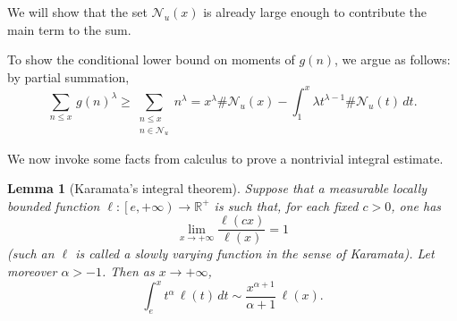 \documentclass[12pt,a4paper,oneside]{amsart}
\newtheorem{lemma}[theorem]{Lemma}
\begin{document}
\medskip

We will show that the set $\mathcal N_u(x)$ is already large enough to contribute the main term to the sum.

To show the conditional lower bound on moments of $g(n)$, we argue as follows: by partial summation,
\[
\sum_{n\le x}\,g(n)^{\lambda} \geq \sum_{\substack{ n \le x \\ n \in \mathcal{N}_u}} n^\lambda = x^\lambda \#\mathcal{N}_u(x) - \int_1^x \lambda t^{\lambda-1} \#\mathcal{N}_u(t) \, dt. \]

We now invoke some facts from calculus \cite[Prop. 1.5.8]{BGT87} to prove a nontrivial integral estimate.

\begin{lemma}[Karamata's integral theorem]\label{karamata}
Suppose that a measurable locally bounded function $\ell : \left [e,+\infty\right) \to \mathbb R^+ $ is such that, for each fixed $c>0$, one has \[ \lim_{x \rightarrow +\infty} \frac{\ell(cx)}{\ell(x)}=1\] (such an $\ell$ is called a \emph{slowly varying} function in the sense of Karamata). Let moreover $\alpha>-1$. Then as $x \to +\infty$,
\[ \int_e^x t^\alpha\, \ell(t)\,dt \sim \frac{x^{\alpha+1}}{\alpha+1}\, \ell(x). \]
\end{lemma}
\end{document}
